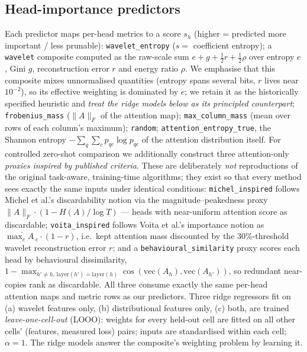\documentclass[conference]{IEEEtran}
\begin{document}
\subsection{Head-importance predictors}
\label{sec:method-pred}
Each predictor maps per-head metrics to a score $s_h$ (higher =
predicted more important / less prunable):
\texttt{wavelet\_entropy} ($s=$ coefficient entropy);
a \texttt{wavelet} composite computed as the raw-scale sum
$e+g+\tfrac12 r+\tfrac12\rho$ over entropy $e$, Gini $g$,
reconstruction error $r$ and energy ratio $\rho$. We emphasise that this
composite mixes unnormalised quantities (entropy spans several bits,
$r$ lives near $10^{-2}$), so its effective weighting is dominated by
$e$; we retain it as the historically specified heuristic and
\emph{treat the ridge models below as its principled counterpart};
\texttt{frobenius\_mass} ($\lVert A\rVert_F$ of the attention map);
\texttt{max\_column\_mass} (mean over rows of each column's maximum);
\texttt{random};
\texttt{attention\_entropy\_true}, the Shannon entropy
$-\sum_q\sum_c p_{qc}\log p_{qc}$ of the attention distribution itself.
For controlled zero-shot comparison we additionally construct three
attention-only \emph{proxies inspired by published criteria}. These are
deliberately \emph{not} reproductions of the original task-aware,
training-time algorithms; they exist so that every method sees exactly
the same inputs under identical conditions:
\texttt{michel\_inspired} follows Michel et al.'s discardability notion
\cite{michel2019} via the magnitude--peakedness proxy
$\lVert A\rVert_F\cdot(1-H(A)/\log T)$ --- heads with near-uniform
attention score as discardable;
\texttt{voita\_inspired} follows Voita et al.'s importance notion
\cite{voita2019} as
$\overline{\max_c A_{\cdot c}}\cdot(1-r)$, i.e.\ kept attention mass
discounted by the 30\%-threshold wavelet reconstruction error $r$; and a
\texttt{behavioural\_similarity} proxy scores each head by behavioural
dissimilarity, $1-\max_{h'\neq h,\,\mathrm{layer}(h')=\mathrm{layer}(h)}
\cos(\mathrm{vec}(A_h),\mathrm{vec}(A_{h'}))$, so redundant near-copies
rank as discardable. All three consume exactly the same per-head
attention maps and metric rows as our predictors. Three ridge regressors
fit on (a) wavelet features only, (b) distributional features only,
(c) both, are trained \emph{leave-one-cell-out} (LOOO): weights for
every held-out cell are fitted on all other cells' (features, measured
loss) pairs; inputs are standardised within each cell; $\alpha{=}1$. The
ridge models answer the composite's weighting problem by learning it.
\end{document}
